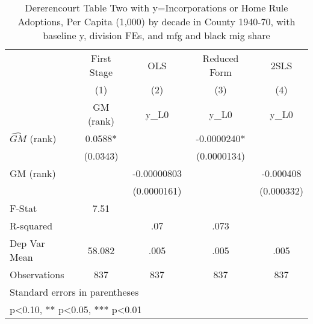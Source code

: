 \begin{table}[htbp]\centering
\def\sym#1{\ifmmode^{#1}\else\(^{#1}\)\fi}
\caption{Dererencourt Table Two with y=Incorporations or Home Rule Adoptions, Per Capita (1,000) by decade in County 1940-70, with baseline y, division FEs, and mfg and black mig share}
\begin{tabular}{l*{4}{c}}
\toprule
                    & First Stage   &         OLS   &Reduced Form   &        2SLS   \\
                    &\multicolumn{1}{c}{(1)}&\multicolumn{1}{c}{(2)}&\multicolumn{1}{c}{(3)}&\multicolumn{1}{c}{(4)}\\
                    &\multicolumn{1}{c}{GM  (rank)}&\multicolumn{1}{c}{y\_L0}&\multicolumn{1}{c}{y\_L0}&\multicolumn{1}{c}{y\_L0}\\
\midrule
$\hat{GM}$ (rank)   &      0.0588*  &               &  -0.0000240*  &               \\
                    &    (0.0343)   &               & (0.0000134)   &               \\
\addlinespace
GM  (rank)          &               & -0.00000803   &               &   -0.000408   \\
                    &               & (0.0000161)   &               &  (0.000332)   \\
\midrule
F-Stat              &        7.51   &               &               &               \\
R-squared           &               &         .07   &        .073   &               \\
Dep Var Mean        &      58.082   &        .005   &        .005   &        .005   \\
Observations        &         837   &         837   &         837   &         837   \\
\bottomrule
\multicolumn{5}{l}{\footnotesize Standard errors in parentheses}\\
\multicolumn{5}{l}{\footnotesize * p<0.10, ** p<0.05, *** p<0.01}\\
\end{tabular}
\end{table}
